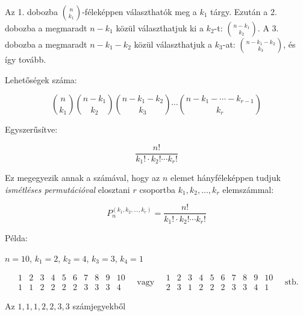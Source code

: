 \begin{solution}
Az 1. dobozba $\binom{n}{k_{1}}$-féleképpen választhatók meg a $k_{1}$
tárgy. Ezután a 2. dobozba a megmaradt $n-k_{1}$ közül választhatjuk
ki a $k_{2}$-t: $\binom{n-k_{1}}{k_{2}}$. A 3. dobozba a megmaradt
$n-k_{1}-k_{2}$ közül választhatjuk a $k_{3}$-at: $\binom{n-k_{1}-k_{2}}{k_{3}}$,
és így tovább.

Lehetőségek száma:

\[
\binom{n}{k_{1}}\binom{n-k_{1}}{k_{2}}\binom{n-k_{1}-k_{2}}{k_{3}}\cdots\binom{n-k_{1}-\cdots-k_{r-1}}{k_{r}}
\]

Egyszerűsítve:

\[
\frac{n!}{k_{1}!\cdot k_{2}!\cdots k_{r}!}
\]

Ez megegyezik annak a számával, hogy az $n$ elemet hányféleképpen
tudjuk \emph{ismétléses permutációval} elosztani $r$ csoportba $k_{1},k_{2},\dots,k_{r}$
elemszámmal:

\[
P_{n}^{(k_{1},k_{2},\dots,k_{r})}=\frac{n!}{k_{1}!\cdot k_{2}!\cdots k_{r}!}
\]

Példa:

$n=10$, $k_{1}=2$, $k_{2}=4$, $k_{3}=3$, $k_{4}=1$

\[
\begin{array}{cccccccccc}
1 & 2 & 3 & 4 & 5 & 6 & 7 & 8 & 9 & 10\\
\hline 1 & 1 & 2 & 2 & 2 & 2 & 3 & 3 & 3 & 4
\end{array}\quad\text{vagy}\quad\begin{array}{cccccccccc}
1 & 2 & 3 & 4 & 5 & 6 & 7 & 8 & 9 & 10\\
\hline 2 & 3 & 1 & 2 & 2 & 2 & 3 & 3 & 4 & 1
\end{array}\quad\text{stb.}
\]
\end{solution}
\begin{extraproblem}
Az $1,1,1,2,2,3,3$ számjegyekből
\end{extraproblem}

